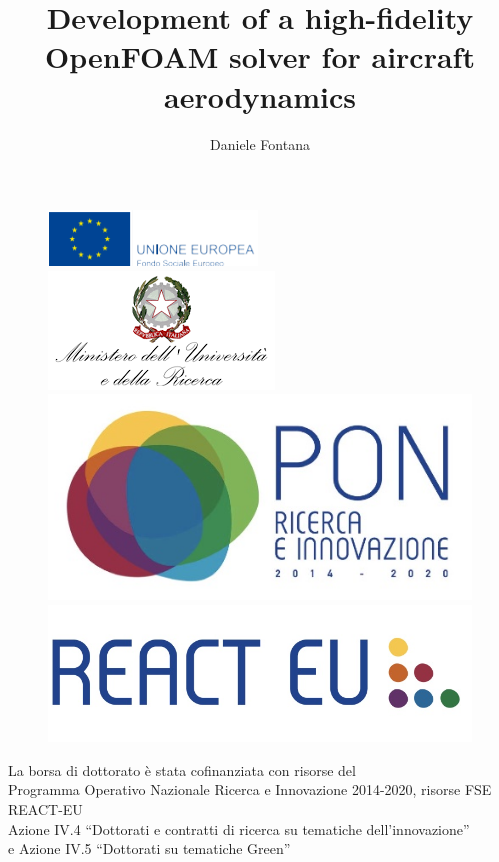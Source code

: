 \documentclass[a5paper]{sapthesis}
\title{Development of a high-fidelity OpenFOAM solver for aircraft aerodynamics}
\author{Daniele Fontana}
\begin{document}
	
	\maketitle
	\dedication{Dedicated to\\ Ilaria}
	
	\newpage
	
	\begin{figure}[h]
		\centering
		\includegraphics[width=0.22\linewidth]{immagini/EU}
		\includegraphics[width=0.22\linewidth]{immagini/Min}
		\includegraphics[width=0.22\linewidth]{immagini/pon}
		\includegraphics[width=0.22\linewidth]{immagini/react}
	\end{figure}
	\begin{center}
		\small %
		La borsa di dottorato è stata cofinanziata con risorse del\\
		Programma Operativo Nazionale Ricerca e Innovazione 2014-2020,	risorse FSE REACT-EU\\
		Azione IV.4 “Dottorati e contratti di ricerca su tematiche dell’innovazione”\\
		e Azione IV.5 “Dottorati su tematiche Green”
	\end{center}
	
\end{document}
